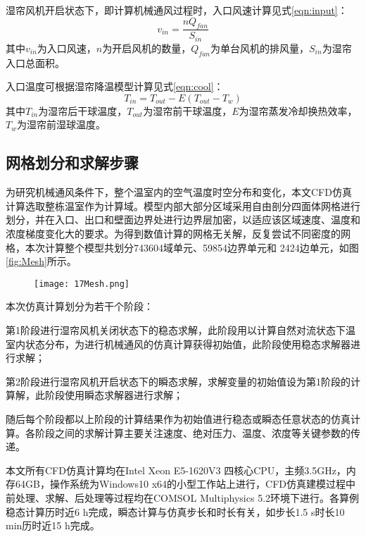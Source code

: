 湿帘风机开启状态下，即计算机械通风过程时，入口风速计算\supercite{RenShougang2015}见式\ref{eqn:input}：
	\begin{equation}
		\label{eqn:input}
		v_{in} = \frac{n Q_{fan}}{S_{in}}
	\end{equation}
其中$v_{in}$为入口风速，$n$为开启风机的数量，$Q_{fan}$为单台风机的排风量，$S_{in}$为湿帘入口总面积。

入口温度可根据湿帘降温模型计算\supercite{JBT}见式\ref{eqn:cool}：
	\begin{equation}
		\label{eqn:cool}
		T_{in}=T_{out}-E (T_{out} - T_{w})
	\end{equation}
其中$T_{in}$为湿帘后干球温度，$T_{out}$为湿帘前干球温度，$E$为湿帘蒸发冷却换热效率，$T_w$为湿帘前湿球温度。

	\subsection{网格划分和求解步骤}
为研究机械通风条件下，整个温室内的空气温度时空分布和变化，本文CFD仿真计算选取整栋温室作为计算域。模型内部大部分区域采用自由剖分四面体网格进行划分，并在入口、出口和壁面边界处进行边界层加密，以适应该区域速度、温度和浓度梯度变化大的要求。为得到数值计算的网格无关解，反复尝试不同密度的网格，本次计算整个模型共划分743604域单元、59854边界单元和 2424边单元，如图\ref{fig:Mesh}所示。

	\begin{figure}[!htbp]
		\centering
		\texttt{[image: 17Mesh.png]}
	\end{figure}
本次仿真计算划分为若干个阶段：

第1阶段进行湿帘风机关闭状态下的稳态求解，此阶段用以计算自然对流状态下温室内状态分布，为进行机械通风的仿真计算获得初始值，此阶段使用稳态求解器进行求解；

第2阶段进行湿帘风机开启状态下的瞬态求解，求解变量的初始值设为第1阶段的计算解，此阶段使用瞬态求解器进行求解；

随后每个阶段都以上阶段的计算结果作为初始值进行稳态或瞬态任意状态的仿真计算。各阶段之间的求解计算主要关注速度、绝对压力、温度、浓度等关键参数的传递。

本文所有CFD仿真计算均在Intel Xeon E5-1620V3 四核心CPU，主频3.5GHz，内存64GB，操作系统为Windows10 x64的小型工作站上进行，CFD仿真建模过程中前处理、求解、后处理等过程均在COMSOL Multiphysics 5.2环境下进行。各算例稳态计算历时近6 h完成，瞬态计算与仿真步长和时长有关，如步长1.5 s时长10 min历时近15 h完成。

